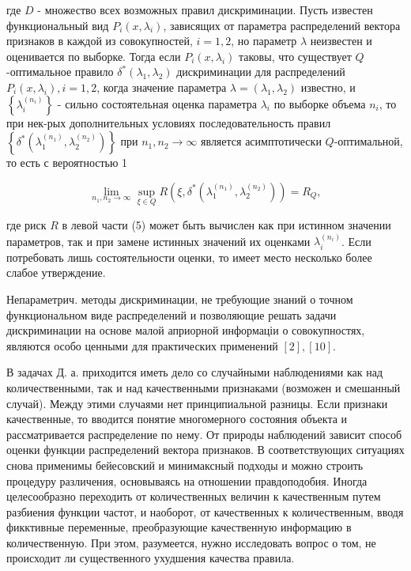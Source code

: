 \documentclass[10pt]{article}
\begin{document}
где $D$ - множество всех возможных правил дискриминации. Пусть известен функциональный вид $P_{i}\left(x, \lambda_{i}\right)$, зависящих от параметра распределений вектора признаков в каждой из совокупностей, $i=1,2$, но параметр $\lambda$ неизвестен и оценивается по выборке. Тогда если $P_{i}\left(x, \lambda_{i}\right)$ таковы, что существует $Q$-оптимальное правило $\delta^{*}\left(\lambda_{1}, \lambda_{2}\right)$ дискриминации для распределений $P_{i}\left(x, \lambda_{i}\right), i=1,2$, когда значение параметра $\lambda=\left(\lambda_{1}, \lambda_{2}\right)$ известно, и $\left\{\lambda_{i}^{\left(n_{i}\right)}\right\}$ - сильно состоятельная оценка параметра $\lambda_{i}$ по выборке объема $n_{i}$, то при нек-рых дополнительных условиях последовательность правил $\left\{\delta^{*}\left(\lambda_{1}^{\left(n_{1}\right)}, \lambda_{2}^{\left(n_{2}\right)}\right)\right\}$ при $n_{1}, n_{2} \rightarrow \infty$ является асимптотически $Q$-оптимальной, то есть с вероятностью 1



\[

\lim _{n_{1}, n_{2} \rightarrow \infty} \sup _{\xi \in Q} R\left(\xi, \delta^{*}\left(\lambda_{1}^{\left(n_{1}\right)}, \lambda_{2}^{\left(n_{2}\right)}\right)\right)=R_{Q},

\]



где риск $R$ в левой части (5) может быть вычислен как при истинном значении параметров, так и при замене истинных значений их оценками $\lambda_{i}^{\left(n_{i}\right)}$. Если потребовать лишь состоятельности оценки, то имеет место несколько более слабое утверждение.



Непараметрич. методы дискриминации, не требующие знаний о точном функциональном виде распределений и позволяющие решать задачи дискриминации на основе малой априорной информаціи о совокупностях, являются особо ценными для практических применений $[2],[10]$.



В задачах Д. а. приходится иметь дело со случайными наблюдениями как над количественными, так и над качественными признаками (возможен и смешанный случай). Между этими случаями нет принципиальной разницы. Если признаки качественные, то вводится понятие многомерного состояния объекта и рассматривается распределение по нему. От природы наблюдений зависит способ оценки функции распределений вектора признаков. В соответствующих ситуациях снова применимы бейесовский и минимаксный подходы и можно строить процедуру различения, основываясь на отношении правдоподобия. Иногда целесообразно переходить от количественных величин к качественным путем разбиения функции частот, и наоборот, от качественных к количественным, вводя фикктивные переменные, преобразующие качественную информацию в количественную. При этом, разумеется, нужно исследовать вопрос о том, не происходит ли существенного ухудшения качества правила.
\end{document}
